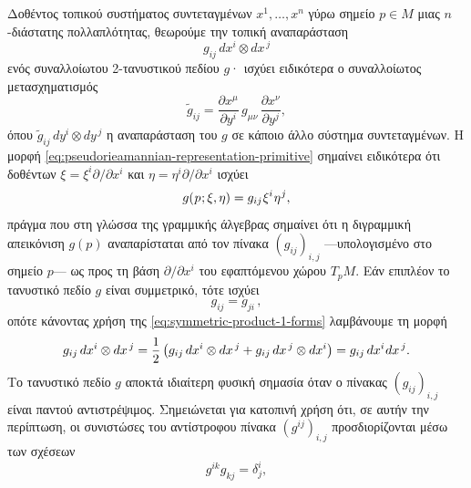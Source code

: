\documentclass[11pt,a4paper,twoside,openright]{book}
\begin{document}
Δοθέντος τοπικού συστήματος συντεταγμένων $x^1, \dots, x^n$
γύρω σημείο $p \in M$ μιας $n$-διάστατης πολλαπλότητας,
θεωρούμε την τοπική αναπαράσταση
\begin{equation}\label{eq:pseudorieamannian-representation-primitive}
g_{ij}\, dx^i \otimes dx^{\,j}
\end{equation}
ενός συναλλοίωτου 2-τανυστικού πεδίου $g$·
ισχύει ειδικότερα ο συναλλοίωτος μετασχηματισμός
\begin{equation}\label{eq:pseudorieamannian-covariance}
\tilde{g}_{ij} = \frac{\partial x^\mu}{\partial y^i}\,g_{\mu \nu}\,\frac{\partial x^\nu}{\partial y^j},
\end{equation}
όπου $\tilde{g}_{ij}\, dy^i \otimes dy^{\,j}$
η αναπαράσταση του $g$ σε κάποιο άλλο σύστημα συντεταγμένων.
Η μορφή
\eqref{eq:pseudorieamannian-representation-primitive}
σημαίνει ειδικότερα ότι δοθέντων $\xi = \xi^i \partial/\partial x^i$ και $\eta = \eta^i \partial/\partial x^i$ ισχύει
\begin{equation}
g(\hspace{.5pt}p\hspace{.5pt}; \xi, \eta)
=
g_{ij} \hspace{.5pt} \xi^i \hspace{.5pt} \eta^{\hspace{.5pt}j},
\end{equation}
πράγμα που στη γλώσσα της γραμμικής άλγεβρας σημαίνει ότι η διγραμμική απεικόνιση $g(p)$ αναπαρίσταται από τον πίνακα $(g_{ij})_{i,j}$ ---υπολογισμένο στο σημείο $p$--- ως προς τη βάση
$\partial/\partial x^i$ του εφαπτόμενου χώρου $T_pM$.
Εάν επιπλέον το τανυστικό πεδίο $g$ είναι συμμετρικό, τότε ισχύει
\begin{equation}
g_{ij} = g_{ji}\,,
\end{equation}
οπότε κάνοντας χρήση της
\eqref{eq:symmetric-product-1-forms}
λαμβάνουμε τη μορφή
\begin{equation}
g_{ij}\, dx^i \otimes dx^{\,j}
=
\frac{1}{2}\left(g_{ij}\, dx^i \otimes dx^{\,j} + g_{ij}\, dx^{\,j} \otimes dx^i\right)
=
g_{ij}\, dx^i \hspace{.5pt} dx^{\,j}.
\end{equation}
Το τανυστικό πεδίο $g$ αποκτά ιδιαίτερη φυσική σημασία όταν
ο πίνακας $(g_{ij})_{i,j}$
είναι παντού αντιστρέψιμος. Σημειώνεται για κατοπινή χρήση ότι, σε αυτήν την περίπτωση, οι συνιστώσες του αντίστροφου πίνακα $(g^{ij})_{i,j}$ προσδιορίζονται μέσω των σχέσεων
\begin{equation}
g^{ik}g_{kj} = \delta^i_j,
\end{equation}
\end{document}
